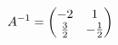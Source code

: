 \documentclass[preview]{standalone}
\begin{document}
\begin{align*}
\special{dvisvgm:raw <g id='unique000'>}A^{-1}=\begin{pmatrix}-2&1\\\frac{3}{2}&-\frac{1}{2}\end{pmatrix}\special{dvisvgm:raw </g>}
\end{align*}
\end{document}
